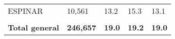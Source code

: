 \begin{tabular}{lllll}
	\cellcolor[HTML]{FF5050}ESPINAR                                & 10,561                                                                & 13.2                                                                             & 15.3                                                                        & 13.1                                                                                \\
	&                                                                       &                                                                                  &                                                                             &                                                                                     \\
	\rowcolor[HTML]{DDEBF7} 
	\textbf{Total   general}                                       & \textbf{246,657}                                                      & \textbf{19.0}                                                                    & \textbf{19.2}                                                               & \textbf{19.0}                                                                      
\end{tabular}